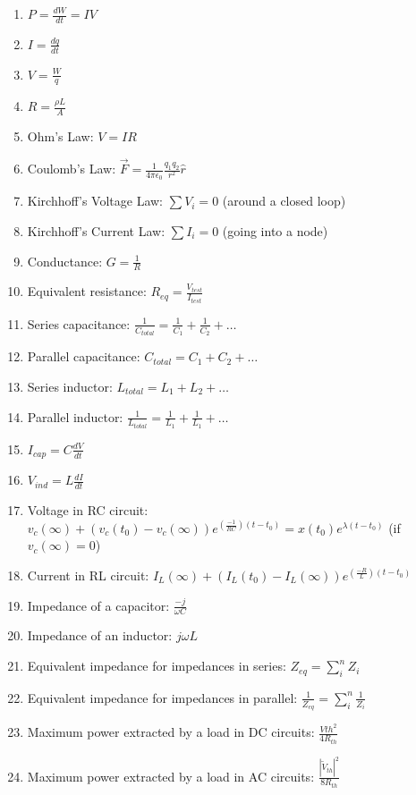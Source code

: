 \documentclass[nobib]{tufte-handout}
\begin{document}
\begin{enumerate}
    \item $P = \frac{dW}{dt} = IV$
    \item $I = \frac{dq}{dt}$
    \item $V = \frac{W}{q}$
    \item $R = \frac{\rho L}{A}$
    \item Ohm's Law: $V=IR$
    \item Coulomb's Law: $\vec{F} = \frac{1}{4\pi \epsilon_0}\frac{q_1 q_2}{r^2}\hat{r}$
    \item Kirchhoff's Voltage Law: $\sum V_i = 0$ (around a closed loop)
    \item Kirchhoff's Current Law: $\sum I_i = 0$ (going into a node)
    \item Conductance: $G = \frac{1}{R}$
    \item Equivalent resistance: $R_{eq} = \frac{V_{test}}{I_{test}}$
    \item Series capacitance: $\frac{1}{C_{total}} = \frac{1}{C_1} + \frac{1}{C_2} + \dots$
    \item Parallel capacitance: $C_{total} = C_1 + C_2 + \dots$
    \item Series inductor: $L_{total} = L_1+L_2+\dots$
    \item Parallel inductor: $\frac{1}{L_{total}} = \frac{1}{L_1} + \frac{1}{L_1} + \dots$
    \item $I_{cap} = C \frac{dV}{dt}$
    \item $V_{ind} = L \frac{dI}{dt}$
    \item Voltage in RC circuit: 
    $v_c(\infty) +\left(v_c(t_0) - v_c(\infty)\right)e^{(\frac{-1}{RC})(t - t_0)} = x(t_0)e^{\lambda (t-t_0)}$
    (if $v_c(\infty) = 0$)
    \item Current in RL circuit: $I_L(\infty) +\left(I_L(t_0) - I_L(\infty)\right)e^{(\frac{-R}{L})(t - t_0)}$
    \item Impedance of a capacitor: $\frac{-j}{\omega C}$
    \item Impedance of an inductor: $j \omega L$
    \item Equivalent impedance for impedances in series: $Z_{eq} = \sum_{i}^{n} Z_i$
    \item Equivalent impedance for impedances in parallel: $\frac{1}{Z_{eq}} = \sum_{i}^{n} \frac{1}{Z_i}$
    \item Maximum power extracted by a load in DC circuits: $\frac{V{th}^2}{4R_{th}}$
    \item Maximum power extracted by a load in AC circuits: $\frac{|\tilde{V}_{th}|^2}{8R_{th}}$
\end{enumerate}
\end{document}
